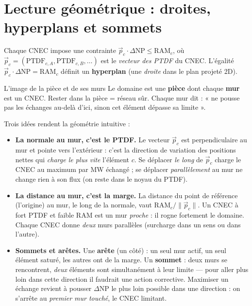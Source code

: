 \documentclass[11pt,a4paper]{article}
\newcommand{\PTDF}{\mathrm{PTDF}}
\begin{document}
\section{Lecture géométrique : droites, hyperplans et sommets}
\label{sec:geometrie}

Chaque CNEC impose une contrainte
$\vec{p}_c \cdot \Delta\mathrm{NP} \le \mathrm{RAM}_c$, où
$\vec{p}_c=(\PTDF_{c,A},\PTDF_{c,B},\dots)$ est le \emph{vecteur des PTDF}
du CNEC. L'égalité $\vec{p}_c\cdot\Delta\mathrm{NP}=\mathrm{RAM}_c$ définit
un \textbf{hyperplan} (une \emph{droite} dans le plan projeté 2D).

\begin{defbox}{L'image de la pièce et de ses murs}
Le domaine est une \textbf{pièce} dont chaque \textbf{mur} est un CNEC.
Rester dans la pièce = réseau sûr. Chaque mur dit : « ne pousse pas les
échanges au-delà d'ici, sinon cet élément dépasse sa limite ».
\end{defbox}

Trois idées rendent la géométrie intuitive :
\begin{itemize}[leftmargin=1.4em]
  \item \textbf{La normale au mur, c'est le PTDF.} Le vecteur $\vec p_c$ est
        perpendiculaire au mur et pointe vers l'extérieur : c'est la
        direction de variation des positions nettes qui \emph{charge le plus
        vite} l'élément $c$. Se déplacer \emph{le long} de $\vec p_c$ charge
        le CNEC au maximum par MW échangé ; se déplacer \emph{parallèlement}
        au mur ne change rien à son flux (on reste dans le noyau du PTDF).
  \item \textbf{La distance au mur, c'est la marge.} La distance du point de
        référence (l'origine) au mur, le long de la normale, vaut
        $\mathrm{RAM}_c/\lVert\vec p_c\rVert$. Un CNEC à fort PTDF et faible
        RAM est un mur \emph{proche} : il rogne fortement le domaine. Chaque
        CNEC donne \emph{deux} murs parallèles (surcharge dans un sens ou
        dans l'autre).
  \item \textbf{Sommets et arêtes.} Une \textbf{arête} (un côté) : un seul
        mur actif, un seul élément saturé, les autres ont de la marge. Un
        \textbf{sommet} : deux murs se rencontrent, \emph{deux} éléments sont
        simultanément à leur limite — pour aller plus loin dans cette
        direction il faudrait une action corrective. Maximiser un échange
        revient à pousser $\Delta\mathrm{NP}$ le plus loin possible dans une
        direction : on s'arrête au \emph{premier mur touché}, le CNEC
        limitant.
\end{itemize}
\end{document}
